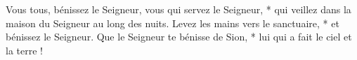Vous tous, bénissez le Seigneur,
vous qui servez le Seigneur, *
qui veillez dans la maison du Seigneur
au long des nuits.
\versseparator
Levez les mains vers le sanctuaire, *
et bénissez le Seigneur.
\versseparator
Que le Seigneur te bénisse de Sion, *
lui qui a fait le ciel et la terre !
